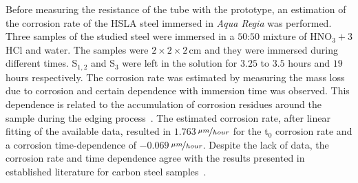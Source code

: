 \documentclass[journal,twoside,web]{ieeecolor}
\begin{document}
Before measuring the resistance of the tube with the prototype, an estimation of the corrosion rate of the HSLA steel immersed in \textit{Aqua Regia} was performed. Three samples of the studied steel were immersed in a $50$:$50$ mixture of HNO$_{3}+3$HCl and water. The samples were $2\times2\times2$\,cm and they were immersed during different times. S$_{1,2}$ and S$_{3}$ were left in the solution for $3.25$ to $3.5$ hours and $19$ hours respectively. The corrosion rate was estimated by measuring the mass loss due to corrosion and certain dependence with immersion time was observed. This dependence is related to the accumulation of corrosion residues around the sample during the edging process~\cite{cramer2003A}. The estimated corrosion rate, after linear fitting of the available data, resulted in $1.763$\,$\nicefrac{\mu m}{hour}$ for the t$_{0}$ corrosion rate and a corrosion time-dependence of $-0.069$\,$\nicefrac{\mu m}{hour}$. Despite the lack of data, the corrosion rate and time dependence agree with the results presented in established literature for carbon steel samples~\cite{cramer2003B}.
\end{document}
